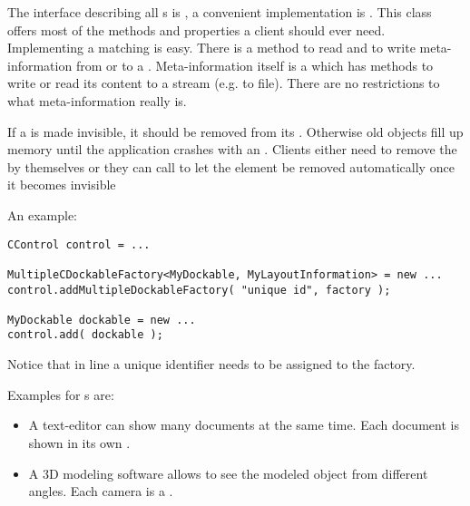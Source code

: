 The interface describing all s is , a convenient implementation is . This class offers most of the methods and properties a client should ever need.
Implementing a matching  is easy. There is a method to read and to write meta-information from or to a . Meta-information itself is a  which has methods to write or read its content to a stream (e.g. to file). There are no restrictions to what meta-information really is.

If a  is made invisible, it should be removed from its \linebreak {}. Otherwise old objects fill up memory until the application crashes with an . Clients either need to remove the  by themselves or they can call  to let the element be removed automatically once it becomes invisible



An example:
\begin{lstlisting}
CControl control = ...

MultipleCDockableFactory<MyDockable, MyLayoutInformation> = new ...
control.addMultipleDockableFactory( "unique id", factory );

MyDockable dockable = new ...
control.add( dockable );
\end{lstlisting}
Notice that in line  a unique identifier needs to be assigned to the factory.

Examples for s are:
\begin{itemize}
 \item A text-editor can show many documents at the same time. Each document is shown in its own .
 \item A 3D modeling software allows to see the modeled object from different angles. Each camera is a .
\end{itemize}

